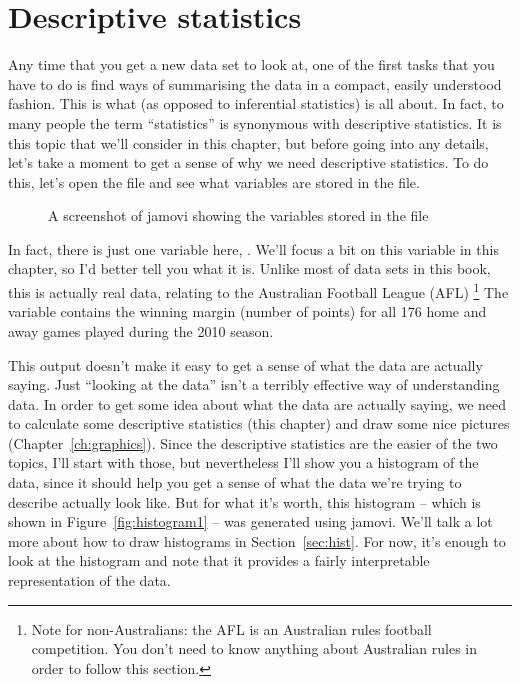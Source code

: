 
\chapter{Descriptive statistics\label{ch:descriptives}}


Any time that you get a new data set to look at, one of the first tasks that you have to do is find ways of summarising the data in a compact, easily understood fashion. This is what  (as opposed to inferential statistics) is all about. In fact, to many people the term ``statistics'' is synonymous with descriptive statistics. It is this topic that we'll consider in this chapter, but before going into any details, let's take a moment to get a sense of why we need descriptive statistics. To do this, let's open the  file and see what variables are stored in the file.

\vspace*{1cm}
\begin{figure}[ht]
\begin{center}
\caption{A screenshot of jamovi showing the variables stored in the  file}
\label{fig:aflsmall}
\HR
\end{center}
\end{figure}

In fact, there is just one variable here, . We'll focus a bit on this variable in this chapter, so I'd better tell you what it is. Unlike most of data sets in this book, this is actually real data, relating to the Australian Football League (AFL) \footnote{Note for non-Australians: the AFL is an Australian rules football competition. You don't need to know anything about Australian rules in order to follow this section.} The  variable contains the winning margin (number of points) for all 176 home and away games played during the 2010 season. 

This output doesn't make it easy to get a sense of what the data are actually saying. Just ``looking at the data'' isn't a terribly effective way of understanding data. In order to get some idea about what the data are actually saying, we need to calculate some descriptive statistics (this chapter) and draw some nice pictures (Chapter~\ref{ch:graphics}). Since the descriptive statistics are the easier of the two topics, I'll start with those, but nevertheless I'll show you a histogram of the  data, since it should help you get a sense of what the data we're trying to describe actually look like. But for what it's worth, this histogram -- which is shown in Figure~\ref{fig:histogram1} -- was generated using jamovi. We'll talk a lot more about how to draw histograms in Section~\ref{sec:hist}. For now, it's enough to look at the histogram and note that it provides a fairly interpretable representation of the  data.

